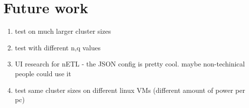 \section{Future work}

\begin{enumerate}
    \item test on much larger cluster sizes
    \item test with different n,q values
    \item UI research for nETL - the JSON config is pretty cool. maybe non-techinical people could use it
    \item test same cluster sizes on different linux VMs (different amount of power per pc)
\end{enumerate}